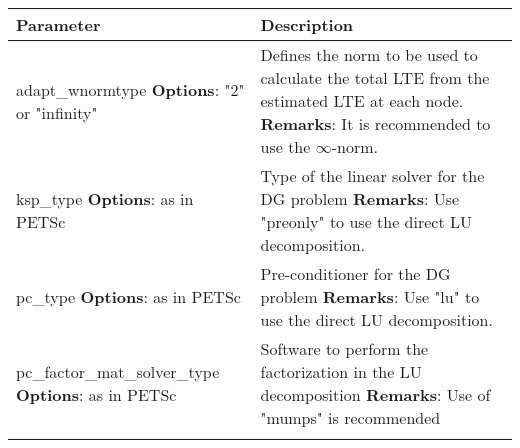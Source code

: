 	\begin{tabularx}{\textwidth}{| >{\raggedright\arraybackslash}m{} | >{\raggedright\arraybackslash}X |}
		\hline
		Parameter & Description \\
		\hline \hline
		adapt\_wnormtype \newline \textbf{Options}: "2" or "infinity" 
		& Defines the norm to be used to calculate the total LTE from the estimated LTE at each node. \newline \textbf{Remarks}: It is recommended to use the $\infty$-norm. \\ 
		\hline
		ksp\_type \newline \textbf{Options}: as in PETSc 
		& Type of the linear solver for the DG problem \newline \textbf{Remarks}: Use "preonly" to use the direct LU decomposition. \\
		\hline
		pc\_type \newline \textbf{Options}: as in PETSc 
		& Pre-conditioner for the DG problem \newline \textbf{Remarks}: Use "lu" to use the direct LU decomposition. \\
		\hline
		pc\_factor\_mat\_solver\_type \newline \textbf{Options}: as in PETSc 
		& Software to perform the factorization in the LU decomposition \newline \textbf{Remarks}: Use of "mumps" is recommended \\		
		\hline
		\caption{Global settings. }
		\label{tab:GlobalSettings}
	\end{tabularx}

